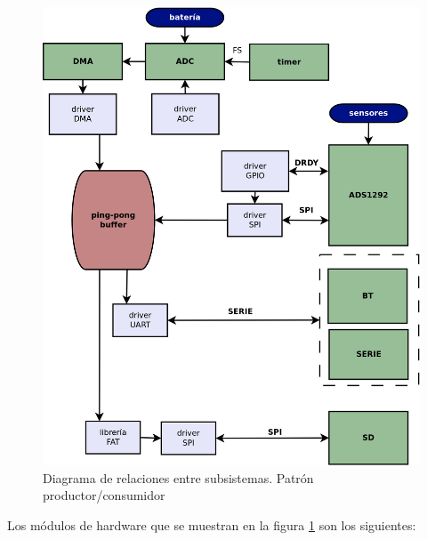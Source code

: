 \begin{figure}[!htbp]
	\centering
	\includegraphics[width=\textwidth]{./Figures/VOP24_patron_dis2.png}
	\caption{Diagrama de relaciones entre subsistemas. Patrón productor/consumidor}
	\label{fig:patronProdCons}
\end{figure}

Los módulos de hardware que se muestran en la figura \ref{fig:patronProdCons} son los siguientes:

